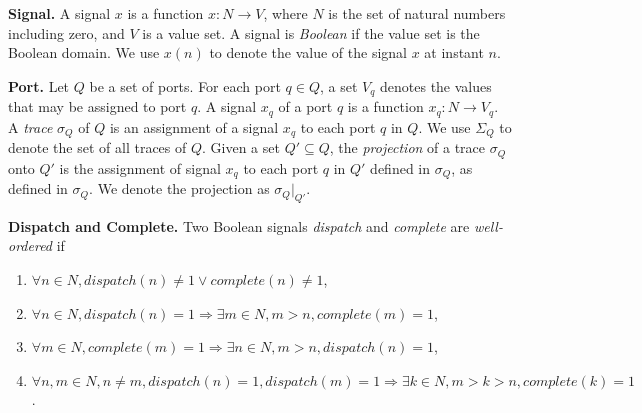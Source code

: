 {\bf Signal.}
A signal $x$ is a function $x: N \rightarrow V$, where $N$ is the set of natural numbers including zero, and $V$ is a value set. 
A signal is \emph{Boolean} if the value set is the Boolean domain.
We use $x(n)$ to denote the value of the signal $x$ at instant $n$. 

{\bf Port.}
Let $Q$  be a set of ports. 
For each port $q \in Q$, a set $V_q$ denotes the values that may be assigned to port $q$. %
A signal $x_q$ of a port $q$ is a function $x_q: N \rightarrow V_q$.
A \emph{trace} $\sigma_Q$ of $Q$ is an assignment of a signal $x_q$ to each port $q$ in $Q$.
We use $\Sigma_Q$ to denote the set of all traces of $Q$.
Given a set $Q' \subseteq Q$, the \emph{projection} of a trace $\sigma_Q$ onto $Q'$ is the assignment of signal $x_q$ to each port $q$ in $Q'$ defined in $\sigma_Q$, as defined in $\sigma_Q$. We denote the projection as $\sigma_Q|_{Q'}$.
 
{\bf Dispatch and Complete.}
Two Boolean signals \emph{dispatch} and \emph{complete} are \emph{well-ordered} if 

\begin{enumerate}
	\item $\forall n \in N, dispatch(n) \ne 1 \vee complete(n) \ne 1 $,
	\item $ \forall n\in N, dispatch(n) = 1 \Rightarrow \exists m\in N, m > n, complete(m) =  1 $,
	\item $ \forall m\in N, complete(m) = 1 \Rightarrow \exists n\in N, m > n, dispatch(n) =  1 $,
	\item $ \forall n,m\in N, n \neq m, dispatch(n) = 1, dispatch(m) = 1 \Rightarrow \exists k\in N, m >k> n, complete(k) = 1 $.
\end{enumerate}

